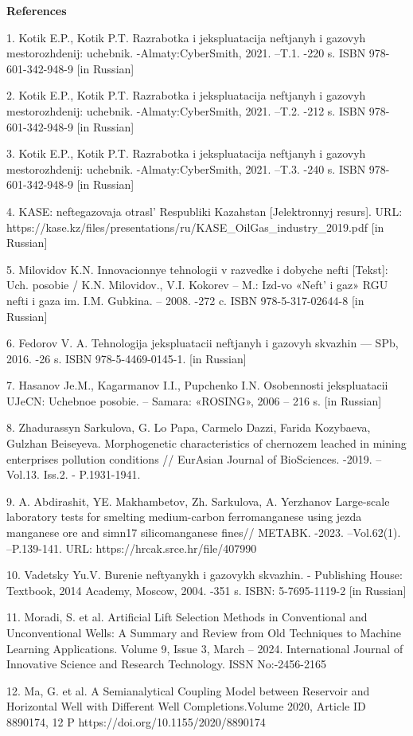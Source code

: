 \begin{center}
{\bfseries References}
\end{center}

\begin{references}
1. Kotik E.P., Kotik P.T. Razrabotka i jekspluatacija neftjanyh i
gazovyh mestorozhdenij: uchebnik. -Almaty:CyberSmith, 2021. --T.1. -220
s. ISBN 978-601-342-948-9 {[}in Russian{]}

2. Kotik E.P., Kotik P.T. Razrabotka i jekspluatacija neftjanyh i
gazovyh mestorozhdenij: uchebnik. -Almaty:CyberSmith, 2021. --T.2. -212
s. ISBN 978-601-342-948-9 {[}in Russian{]}

3. Kotik E.P., Kotik P.T. Razrabotka i jekspluatacija neftjanyh i
gazovyh mestorozhdenij: uchebnik. -Almaty:CyberSmith, 2021. --T.3. -240
s. ISBN 978-601-342-948-9 {[}in Russian{]}

4. KASE: neftegazovaja otrasl'{} Respubliki Kazahstan
{[}Jelektronnyj resurs{]}. URL:
https://kase.kz/files/presentations/ru/KASE\_OilGas\_industry\_2019.pdf
{[}in Russian{]}

5. Milovidov K.N. Innovacionnye tehnologii v razvedke i dobyche nefti
{[}Tekst{]}: Uch. posobie / K.N. Milovidov., V.I. Kokorev -- M.: Izd-vo
«Neft'{} i gaz» RGU nefti i gaza im. I.M. Gubkina. --
2008. -272 c. ISBN 978-5-317-02644-8 {[}in Russian{]}

6. Fedorov V. A. Tehnologija jekspluatacii neftjanyh i gazovyh skvazhin
--- SPb, 2016. -26 s. ISBN 978-5-4469-0145-1. {[}in Russian{]}

7. Hasanov Je.M., Kagarmanov I.I., Pupchenko I.N. Osobennosti
jekspluatacii UJeCN: Uchebnoe posobie. -- Samara: «ROSING», 2006 -- 216
s. {[}in Russian{]}

8. Zhadurassyn Sarkulova, G. Lo Papa, Carmelo Dazzi, Farida Kozybaeva,
Gulzhan Beiseyeva. Morphogenetic characteristics of chernozem leached in
mining enterprises pollution conditions // EurAsian Journal of
BioSciences. -2019. --Vol.13. Iss.2. - P.1931-1941.

9. A. Abdirashit, YE. Makhambetov, Zh. Sarkulova, A. Yerzhanov
Large-scale laboratory tests for smelting medium-carbon ferromanganese
using jezda manganese ore and simn17 silicomanganese fines// METABK.
-2023. --Vol.62(1). --P.139-141. URL: https://hrcak.srce.hr/file/407990

10. Vadetsky Yu.V. Burenie neftyanykh i gazovykh skvazhin. - Publishing
House: Textbook, 2014 Academy, Moscow, 2004. -351 s. ISBN: 5-7695-1119-2
{[}in Russian{]}

11. Moradi, S. et al. Artificial Lift Selection Methods in Conventional
and Unconventional Wells: A Summary and Review from Old Techniques to
Machine Learning Applications. Volume 9, Issue 3, March -- 2024.
International Journal of Innovative Science and Research Technology.
ISSN No:-2456-2165

12. Ma, G. et al. A Semianalytical Coupling Model between Reservoir and
Horizontal Well with Different Well Completions.Volume 2020, Article ID
8890174, 12 P https://doi.org/10.1155/2020/8890174
\end{references}

